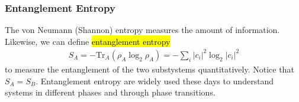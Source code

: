 \subsubsection{Entanglement Entropy}

The von Neumann (Shannon) entropy measures the amount of information. Likewise, we can define \hl{entanglement entropy}
\begin{align*}
    S_A=-\mathrm{Tr}_A\left( \rho_A\log_2\rho_A \right)=-\sum_i|c_i|^2\log_2|c_i|^2
\end{align*}
to measure the entanglement of the two substystems quantitatively. Notice that $S_A=S_B$. Entanglement entropy are widely used these days to understand systems in different phases and through phase transitions. 